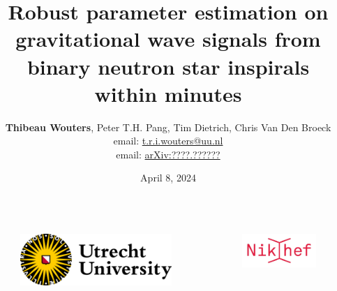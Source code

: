 \documentclass[usenames,dvipsnames,t]{beamer}
\title[Extreme matter/PE] %
{Robust parameter estimation on gravitational wave signals from binary neutron star inspirals within minutes}
\author[Thibeau Wouters]{\small{\textbf{Thibeau Wouters}, Peter T.H. Pang, Tim Dietrich, Chris Van Den Broeck} \\ \vspace{7mm} email: \href{mailto:t.r.i.wouters@uu.nl}{t.r.i.wouters@uu.nl} \\ \vspace{3mm} email: \href{https://arxiv.org/}{arXiv:????.??????}  }
\date{April 8, 2024}
\begin{document}
{


\begin{frame}[plain]
\titlepage

\begin{columns}
  \begin{figure}
    \centering
    \vspace{1.5mm}
    \includegraphics[width=0.75\linewidth]{Figures/utrecht-university.png}
  \end{figure}
  \begin{figure}
    \centering
    \includegraphics[width=0.75\linewidth]{Figures/Nikhef_logo-transparent.png}
  \end{figure}
\end{columns}



\end{frame}
}
\end{document}
